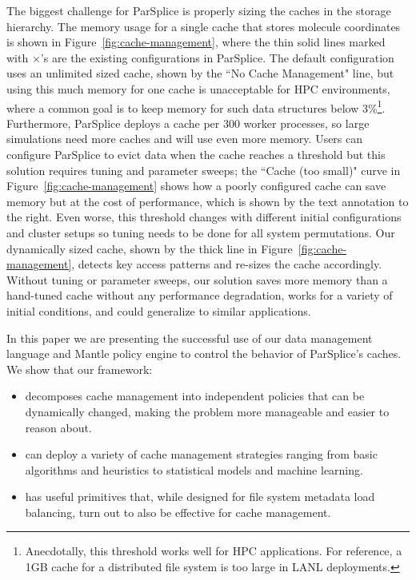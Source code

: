 The biggest challenge for ParSplice is properly sizing the caches in the
storage hierarchy.  The memory usage for a single cache that stores molecule
coordinates is shown in Figure~\ref{fig:cache-management}, where the thin solid
lines marked with \(\times\)'s are the existing configurations in ParSplice.
The default configuration uses an unlimited sized cache, shown by the ``No
Cache Management" line, but using this much memory for one cache is
unacceptable for HPC environments, where a common goal is to keep memory for
such data structures below 3\%\footnote{Anecdotally, this threshold works well
for HPC applications.  For reference, a 1GB cache for a distributed file system
is too large in LANL deployments.}. Furthermore, ParSplice deploys a cache per
300 worker processes, so large simulations need more caches and will use even
more memory.  Users can configure ParSplice to evict data when the cache
reaches a threshold but this solution requires tuning and parameter sweeps; the
``Cache (too small)" curve in Figure~\ref{fig:cache-management} shows how a
poorly configured cache can save memory but at the cost of performance, which
is shown by the text annotation to the right.  Even worse, this threshold
changes with different initial configurations and cluster setups so tuning
needs to be done for all system permutations.  Our dynamically sized cache,
shown by the thick line in Figure~\ref{fig:cache-management}, detects key
access patterns and re-sizes the cache accordingly.  Without tuning or
parameter sweeps, our solution saves more memory than a hand-tuned cache
without any performance degradation, works for a variety of initial conditions,
and could generalize to similar applications.

In this paper we are presenting the successful use of our data management
language and Mantle policy engine to control the behavior of ParSplice's
caches. We show that our framework:

\begin{itemize}

  \item decomposes cache management into independent policies that can be
  dynamically changed, making the problem more manageable and easier to reason
  about.

  \item can deploy a variety of cache management strategies ranging from basic
  algorithms and heuristics to statistical models and machine learning.

  \item has useful primitives that, while designed for file system metadata
  load balancing, turn out to also be effective for cache management. 

\end{itemize}

